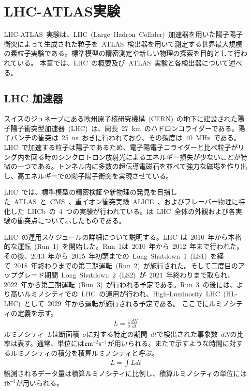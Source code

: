 \chapter{LHC-ATLAS実験}
\thispagestyle{empty}
\label{chap:2}
LHC-ATLAS~実験は、LHC~(Large~Hadron~Collider)~加速器を用いた陽子陽子衝突によって生成された粒子を~ATLAS~検出器を用いて測定する世界最大規模の素粒子実験である。標準模型の精密測定や新しい物理の探索を目的として行われている。
本章では、LHC~の概要及び~ATLAS~実験と各検出器について述べる。

\section{LHC 加速器}
スイスのジュネーブにある欧州原子核研究機構~(CERN)~の地下に建設された陽子陽子衝突型加速器~(LHC)~は、周長~27~km~のハドロンコライダーである。陽子バンチの衝突は~25~ns~おきに行われており、その頻度は~40~MHz~である。LHC~で加速する粒子は陽子であるため、電子陽電子コライダーと比べ粒子がリング内を回る時のシンクロトロン放射光によるエネルギー損失が少ないことが特徴の一つである。トンネル内に多数の超伝導電磁石を並べて強力な磁場を作り出し、高エネルギーでの陽子陽子衝突を実現させている。

LHC~では、標準模型の精密検証や新物理の発見を目指した~ATLAS~\cite{URL:13}と~CMS~\cite{URL:14}、重イオン衝突実験~ALICE~\cite{URL:15}、およびフレーバー物理に特化した~LHCb~\cite{URL:16}の~4~つの実験が行われている。は~LHC~全体の外観および各実験の衝突点について示したものである。

LHC~の運用スケジュールの詳細について説明する。LHC~は~2010~年から本格的な運転~(Run~1)~を開始した。Run~1は~2010~年から~2012~年まで行われた。その後、2013~年から~2015~年初頭までの~Long~Shutdown~1~(LS1)~を経て~2018~年終わりまでの第二期運転~(Run~2)~が施行された。そして二度目のアップグレード期間~Long~Shutdown~2~(LS2)~が~2021~年終わりまで取られ、2022~年から第三期運転~(Run~3)~が行われる予定である。Run~3~の後には、より高いルミノシティでの~LHC~の運用が行われ、High-Luminosity~LHC~(HL-LHC)~として~2029~年から運転が施行される予定である。
ここでにルミノシティの定義を示す。
\begin{align}
    L = \frac{1}{\sigma}\frac{dN}{dt} \label{eq:lumi}
\end{align}
ルミノシティ~$L$は断面積~$\sigma$に対する特定の期間~$dt$で検出された事象数~$dN$の比率は表す。通常、単位には$\rm{cm}^{-2}\rm{s}^{-1}$が用いられる。またで示すような時間に対するルミノシティの積分を積算ルミノシティと呼ぶ。
\begin{align}
    L = \int{Ldt} \label{eq:ilumi}
\end{align}
観測されるデータ量は積算ルミノシティに比例し、積算ルミノシティの単位には$\rm{fb}^{-1}$が用いられる。

